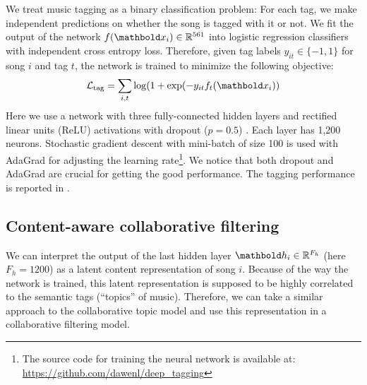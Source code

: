 We treat music tagging as a binary classification problem: For each tag, we make independent predictions on whether the song is tagged with it or not. We fit the output of the network $f(\mb{x}_i) \in \mathbb{R}^{561}$ into logistic regression classifiers with independent cross entropy loss. Therefore, given tag labels $y_{it} \in \{-1, 1\}$ for song $i$ and tag $t$, the network is trained to minimize the following objective:
\[\cL_{\text{tag}} = \sum_{i, t} \log (1 + \exp(-y_{it} f_t(\mb{x}_i))\]
Here we use a network with three fully-connected hidden layers and rectified linear units (ReLU) activations with dropout ($p = 0.5$) \citep{srivastava2014dropout}. Each layer has 1,200 neurons. Stochastic gradient descent with mini-batch of size 100 is used with AdaGrad \citep{duchi2011adaptive} for adjusting the learning rate\footnote{The source code for training the neural network is available at: \url{https://github.com/dawenl/deep_tagging}}. We notice that both dropout and AdaGrad are crucial for getting the good performance. The tagging performance is reported in .


\subsection{Content-aware collaborative filtering} \label{sec:content}

We can interpret the output of the last hidden layer $\mb{h}_i \in \mathbb{R}^{F_h}$ (here $F_h = 1200$) as a latent content representation of song $i$. Because of the way the network is trained, this latent representation is supposed to be highly correlated to the semantic tags (``topics'' of music). Therefore, we can take a similar approach to the collaborative topic model and use this representation in a collaborative filtering model. 

